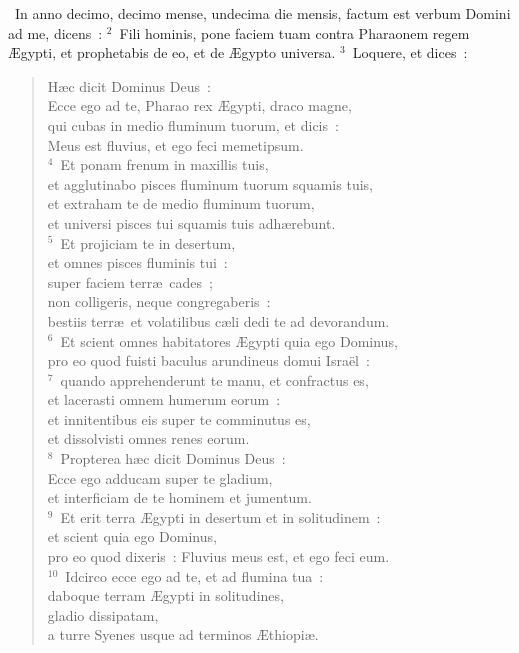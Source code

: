 ~In anno decimo, decimo mense, undecima die mensis, factum est verbum Domini ad me, dicens~:
${}^{2}$~Fili hominis, pone faciem tuam contra Pharaonem regem \AE gypti, et prophetabis de eo, et de \AE gypto universa.
${}^{3}$~Loquere, et dices~: \begin{flushleft}\begin{verse}H\ae c dicit Dominus Deus~:\\ Ecce ego ad te, Pharao rex \AE gypti, draco magne,\\ qui cubas in medio fluminum tuorum, et dicis~:\\ Meus est fluvius, et ego feci memetipsum.\\
${}^{4}$~Et ponam frenum in maxillis tuis,\\ et agglutinabo pisces fluminum tuorum squamis tuis,\\ et extraham te de medio fluminum tuorum,\\ et universi pisces tui squamis tuis adh\ae rebunt.\\
${}^{5}$~Et projiciam te in desertum,\\ et omnes pisces fluminis tui~:\\ super faciem terr\ae\ cades~;\\ non colligeris, neque congregaberis~:\\ bestiis terr\ae\ et volatilibus c\ae li dedi te ad devorandum.\\
${}^{6}$~Et scient omnes habitatores \AE gypti quia ego Dominus,\\ pro eo quod fuisti baculus arundineus domui Isra\"el~:\\
${}^{7}$~quando apprehenderunt te manu, et confractus es,\\ et lacerasti omnem humerum eorum~:\\ et innitentibus eis super te comminutus es,\\ et dissolvisti omnes renes eorum.\\
${}^{8}$~Propterea h\ae c dicit Dominus Deus~:\\ Ecce ego adducam super te gladium,\\ et interficiam de te hominem et jumentum.\\
${}^{9}$~Et erit terra \AE gypti in desertum et in solitudinem~:\\ et scient quia ego Dominus,\\ pro eo quod dixeris~: Fluvius meus est, et ego feci eum.\\
${}^{10}$~Idcirco ecce ego ad te, et ad flumina tua~:\\ daboque terram \AE gypti in solitudines,\\ gladio dissipatam,\\ a turre Syenes usque ad terminos \AE thiopi\ae .\\

\end{verse}
\end{flushleft}
